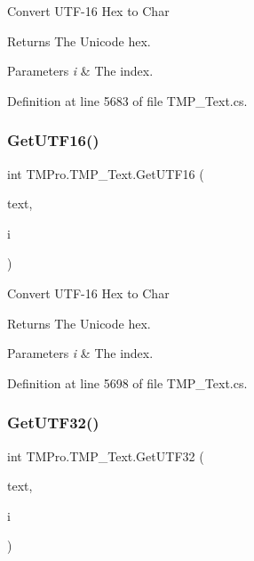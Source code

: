 Convert U\+T\+F-\/16 Hex to Char 

\begin{DoxyReturn}{Returns}
The Unicode hex.
\end{DoxyReturn}

\begin{DoxyParams}{Parameters}
{\em i} & The index.\\
\hline
\end{DoxyParams}


Definition at line 5683 of file T\+M\+P\+\_\+\+Text.\+cs.

\mbox{\label{class_t_m_pro_1_1_t_m_p___text_a0cfc7cb7ac6ce49e764d26bc9c3ffcee}} 
\subsubsection{\texorpdfstring{GetUTF16()}{GetUTF16()}\hspace{0.1cm}{\footnotesize\ttfamily [2/2]}}
{\footnotesize\ttfamily int T\+M\+Pro.\+T\+M\+P\+\_\+\+Text.\+Get\+U\+T\+F16 (\begin{DoxyParamCaption}\item[{String\+Builder}]{text,  }\item[{int}]{i }\end{DoxyParamCaption})\hspace{0.3cm}{\ttfamily [protected]}}



Convert U\+T\+F-\/16 Hex to Char 

\begin{DoxyReturn}{Returns}
The Unicode hex.
\end{DoxyReturn}

\begin{DoxyParams}{Parameters}
{\em i} & The index.\\
\hline
\end{DoxyParams}


Definition at line 5698 of file T\+M\+P\+\_\+\+Text.\+cs.

\mbox{\label{class_t_m_pro_1_1_t_m_p___text_add381cfff574155b2b44eddc9fedd883}} 
\subsubsection{\texorpdfstring{GetUTF32()}{GetUTF32()}\hspace{0.1cm}{\footnotesize\ttfamily [1/2]}}
{\footnotesize\ttfamily int T\+M\+Pro.\+T\+M\+P\+\_\+\+Text.\+Get\+U\+T\+F32 (\begin{DoxyParamCaption}\item[{string}]{text,  }\item[{int}]{i }\end{DoxyParamCaption})\hspace{0.3cm}{\ttfamily [protected]}}



